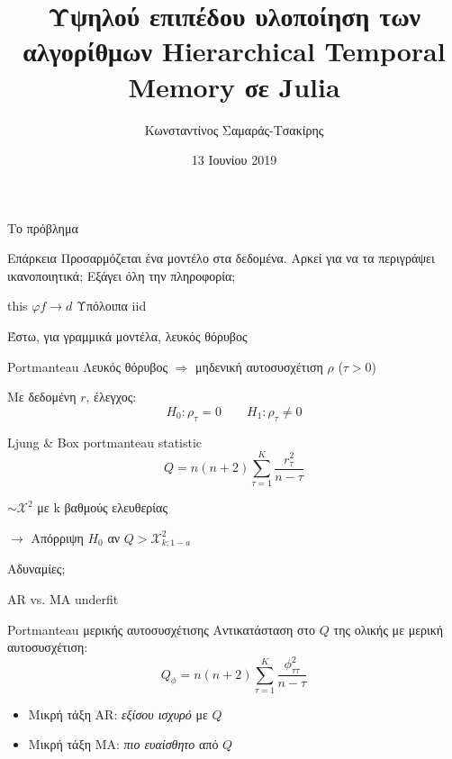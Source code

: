 \documentclass[11pt,center,lualatex]{beamer}
\title{\huge{Υψηλού επιπέδου υλοποίηση των αλγορίθμων Hierarchical Temporal Memory σε Julia}}
\author{Κωνσταντίνος Σαμαράς-Τσακίρης}
\date{13 Ιουνίου 2019}
\begin{document}
\begin{frame}%
  \titlepage
\end{frame}

\begin{frame}{Το πρόβλημα}
  \begin{block}{Επάρκεια}
	Προσαρμόζεται ένα μοντέλο στα δεδομένα. Αρκεί για να τα περιγράψει ικανοποιητικά; Εξάγει όλη την πληροφορία;
  \end{block}

  \pause
  this $φ f \rightarrow d$ Υπόλοιπα \alert{iid}

  \pause
  Έστω, για γραμμικά μοντέλα, \alert{λευκός θόρυβος}
\end{frame}

\begin{frame}{Portmanteau}
  Λευκός θόρυβος $\Rightarrow$ μηδενική αυτοσυσχέτιση $\rho$ ($\tau > 0$)

  \pause
  Με δεδομένη $r$, έλεγχος:
  $$ H_0: \rho_\tau = 0 \qquad H_1: \rho_\tau \neq 0$$

  \pause
  \begin{block}{Ljung \& Box portmanteau statistic}
	$$ Q = n(n+2) \sum^{K}_{\tau=1} \frac{r_\tau^2}{n-\tau} $$

	$ \sim \mathcal{X}^2 $ με k βαθμούς ελευθερίας

	$\rightarrow$ Απόρριψη $H_0$ αν $ Q > \mathcal{X}^2_{k;1-a} $
  \end{block}

  \pause
  \vspace{1em} \centering
  Αδυναμίες;
\end{frame}

\begin{frame}{AR vs. MA underfit}
  \begin{block}{Portmanteau μερικής αυτοσυσχέτισης \tiny{\cite{monti1994}}}
    Αντικατάσταση στο $Q$ της ολικής με μερική αυτοσυσχέτιση:
    $$ Q_\phi = n(n+2) \sum^{K}_{\tau=1} \frac{\phi_{\tau\tau}^2}{n-\tau} $$
  \end{block}

  \pause
  \begin{itemize}
    \item Μικρή τάξη AR: \emph{εξίσου ισχυρό} με $Q$
    \item Μικρή τάξη \alert{MA}: \emph{πιο ευαίσθητο} από $Q$
  \end{itemize}
\end{frame}
\end{document}
